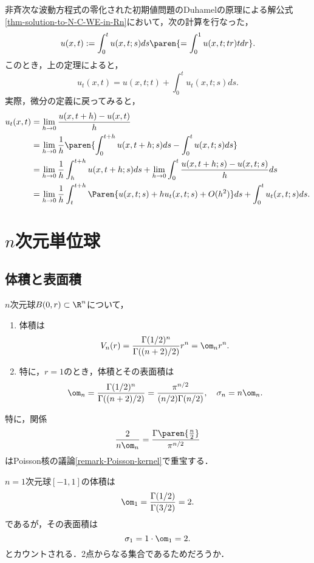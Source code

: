 \documentclass[uplatex,dvipdfmx]{jsreport}
\begin{document}
\begin{example}\label{exp-moving-region-appeared-in-N-C-WE}
    非斉次な波動方程式の零化された初期値問題のDuhamelの原理による解公式\ref{thm-solution-to-N-C-WE-in-Rn}において，次の計算を行なった，
    \[u(x,t):=\int^t_0u(x,t;s)ds\paren{=\int^1_0u(x,t;tr)tdr}.\]
    このとき，上の定理によると，
    \[u_t(x,t)=u(x,t;t)+\int^t_0u_t(x,t;s)ds.\]
    実際，微分の定義に戻ってみると，
    \begin{align*}
        u_t(x,t)&=\lim_{h\to0}\frac{u(x,t+h)-u(x,t)}{h}\\
        &=\lim_{h\to0}\frac{1}{h}\paren{\int^{t+h}_0u(x,t+h;s)ds-\int^t_0u(x,t;s)ds}\\
        &=\lim_{h\to0}\frac{1}{h}\int^{t+h}_hu(x,t+h;s)ds+\lim_{h\to0}\int^t_0\frac{u(x,t+h;s)-u(x,t;s)}{h}ds\\
        &=\lim_{h\to0}\frac{1}{h}\int^{t+h}_t\Paren{u(x,t;s)+hu_t(x,t;s)+O(h^2)}ds+\int^t_0u_t(x,t;s)ds.
    \end{align*}
\end{example}

\section{$n$次元単位球}

\subsection{体積と表面積}

\begin{theorem}[球の体積]
    $n$次元球$B(0,r)\subset\R^n$について，
    \begin{enumerate}
        \item 体積は
        \[V_n(r)=\frac{\Gamma(1/2)^n}{\Gamma((n+2)/2)}r^n=\om_nr^n.\]
        \item 特に，$r=1$のとき，体積とその表面積は
        \[\om_n=\frac{\Gamma(1/2)^n}{\Gamma((n+2)/2)}=\frac{\pi^{n/2}}{(n/2)\Gamma(n/2)},\quad\sigma_n=n\om_n.\]
    \end{enumerate}
    特に，関係
    \[\frac{2}{n\om_n}=\frac{\Gamma\paren{\frac{n}{2}}}{\pi^{n/2}}\]
    はPoisson核の議論\ref{remark-Poisson-kernel}で重宝する．
\end{theorem}
\begin{remark}
    $n=1$次元球$[-1,1]$の体積は
    \[\om_1=\frac{\Gamma(1/2)}{\Gamma(3/2)}=2.\]
    であるが，その表面積は
    \[\sigma_1=1\cdot\om_1=2.\]
    とカウントされる．2点からなる集合であるためだろうか．
\end{remark}
\end{document}
